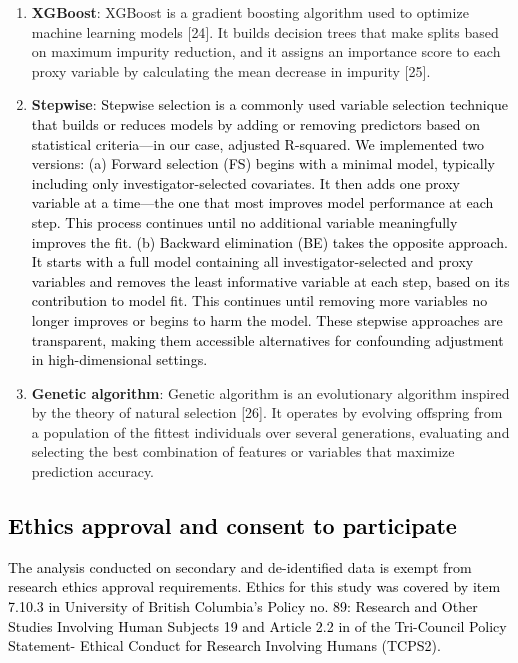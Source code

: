 \documentclass[10pt,letterpaper]{article}
\begin{document}
\begin{enumerate}
  variable based on the decrease in impurity or Gini importance,
  providing a ranking of the proxies. The top 100 variables from this
  ranking are manually selected for further modeling {[}8{]}.
\item
  \textbf{XGBoost}: XGBoost is a gradient boosting algorithm used to
  optimize machine learning models {[}24{]}. It builds decision trees
  that make splits based on maximum impurity reduction, and it assigns
  an importance score to each proxy variable by calculating the mean
  decrease in impurity {[}25{]}.
\item
  \textbf{Stepwise}:
  \textcolor{black}{Stepwise selection is a commonly used variable selection technique that builds or reduces models by adding or removing predictors based on statistical criteria—in our case, adjusted R-squared. We implemented two versions: (a) Forward selection (FS) begins with a minimal model, typically including only investigator-selected covariates. It then adds one proxy variable at a time—the one that most improves model performance at each step. This process continues until no additional variable meaningfully improves the fit. (b) Backward elimination (BE) takes the opposite approach. It starts with a full model containing all investigator-selected and proxy variables and removes the least informative variable at each step, based on its contribution to model fit. This continues until removing more variables no longer improves or begins to harm the model. These stepwise approaches are transparent, making them accessible alternatives for confounding adjustment in high-dimensional settings.}
\item
  \textbf{Genetic algorithm}: Genetic algorithm is an evolutionary
  algorithm inspired by the theory of natural selection {[}26{]}. It
  operates by evolving offspring from a population of the fittest
  individuals over several generations, evaluating and selecting the
  best combination of features or variables that maximize prediction
  accuracy.
\end{enumerate}

\subsection*{\texorpdfstring{\textcolor{black}{Ethics approval and consent to participate}}{}}\label{section}

\textcolor{black}{The analysis conducted on secondary and de-identified data is exempt from research ethics approval requirements. Ethics for this study was covered by item 7.10.3 in University of British Columbia's Policy no. 89: Research and Other Studies Involving Human Subjects 19 and Article 2.2 in of the Tri-Council Policy Statement- Ethical Conduct for Research Involving Humans (TCPS2).}
\end{document}
